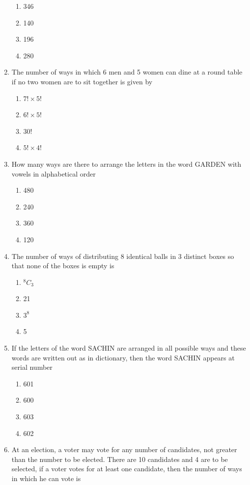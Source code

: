 \documentclass[journal,12pt,twocolumn]{IEEEtran}
\newcommand*{\Comb}[2]{{}^{#1}C_{#2}}%
\begin{document}
\begin{enumerate}
\begin{enumerate}
\item 346
\item 140 
\item 196
\item 280\\
\end{enumerate}
\item The number of ways in which 6 men and 5 women can dine at a round table if no two women are to sit together is given by
\begin{enumerate}
\item $7! \times 5!$
\item $6! \times 5!$
\item 30!
\item $5! \times 4!$\\
\end{enumerate}
\item How many ways are there to arrange the letters in the word GARDEN with vowels in alphabetical order
\begin{enumerate}
\item 480
\item 240 
\item 360
\item 120\\
\end{enumerate}
\item The number of ways of distributing 8 identical balls in 3 distinct boxes so that none of the boxes is empty is 
\begin{enumerate}
\item $\Comb{8}{3}$
\item 21
\item $3^8$
\item 5\\
\end{enumerate}
\item If the letters of the word SACHIN are arranged in all possible ways and these words are written out as in dictionary, then the word SACHIN appears at serial number
\begin{enumerate}
\item 601
\item 600 
\item 603
\item 602\\
\end{enumerate}
\item At an election, a voter may vote for any number of candidates, not greater than the number to be elected. There are 10 candidates and 4 are to be selected, if a voter votes for at least one candidate, then the number of ways in which he can vote is

\end{enumerate}
\end{document}
